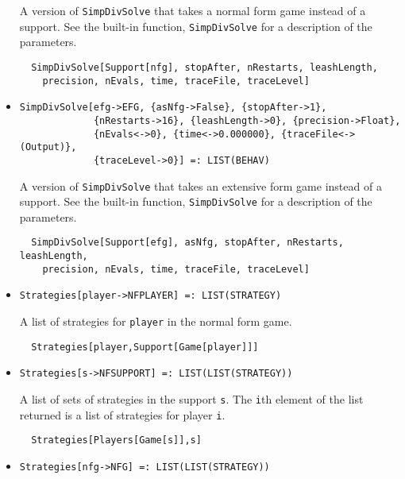 \begin{itemize}
\bd 
A version of \verb+SimpDivSolve+ that takes a normal form
game instead of a support.  See the built-in function,
\verb+SimpDivSolve+ for a description of the parameters.
\begin{verbatim}
  SimpDivSolve[Support[nfg], stopAfter, nRestarts, leashLength,
    precision, nEvals, time, traceFile, traceLevel]
\end{verbatim} 
\ed

\item{}
\protect \large \begin{verbatim}
SimpDivSolve[efg->EFG, {asNfg->False}, {stopAfter->1}, 
             {nRestarts->16}, {leashLength->0}, {precision->Float}, 
             {nEvals<->0}, {time<->0.000000}, {traceFile<->(Output)}, 
             {traceLevel->0}] =: LIST(BEHAV) 
\end{verbatim}\normalsize

\bd 
A version of \verb+SimpDivSolve+ that takes an extensive form
game instead of a support.  See the built-in function,
\verb+SimpDivSolve+ for a description of the parameters.
\begin{verbatim}
  SimpDivSolve[Support[efg], asNfg, stopAfter, nRestarts, leashLength,
    precision, nEvals, time, traceFile, traceLevel]
\end{verbatim} 
\ed

\item{}
\protect \large \begin{verbatim}
Strategies[player->NFPLAYER] =: LIST(STRATEGY) 
\end{verbatim}\normalsize

\bd 
A list of strategies for \verb+player+ in the normal form game.  
\begin{verbatim}
  Strategies[player,Support[Game[player]]]
\end{verbatim} 
\ed

\item{}
\protect \large \begin{verbatim}
Strategies[s->NFSUPPORT] =: LIST(LIST(STRATEGY)) 
\end{verbatim}\normalsize

\bd 
A list of sets of strategies in the support \verb+s+. The \verb+i+th
element of the list returned is a list of strategies for player
\verb+i+.   
\begin{verbatim}
  Strategies[Players[Game[s]],s]
\end{verbatim} 
\ed


\item{}
\protect \large \begin{verbatim}
Strategies[nfg->NFG] =: LIST(LIST(STRATEGY)) 
\end{verbatim}\normalsize


\end{itemize}
